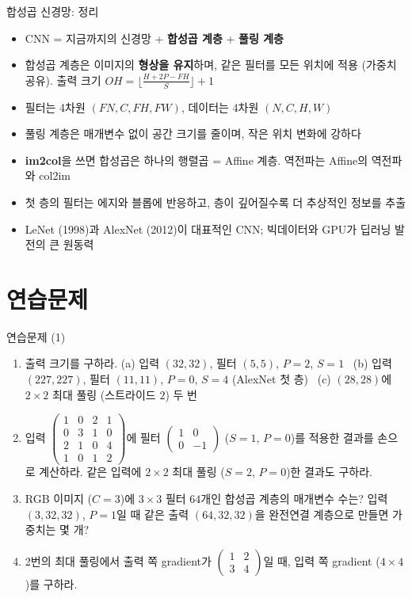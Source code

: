 \documentclass[aspectratio=169,11pt]{beamer}
\begin{document}
\begin{frame}{합성곱 신경망: 정리}
\begin{keybox}
\small
\begin{itemize}
\item CNN = 지금까지의 신경망 + \textbf{합성곱 계층} + \textbf{풀링 계층}
\item 합성곱 계층은 이미지의 \textbf{형상을 유지}하며, 같은 필터를 모든 위치에 적용 (가중치 공유).
출력 크기 $OH=\lfloor\frac{H+2P-FH}{S}\rfloor+1$
\item 필터는 4차원 $(FN,C,FH,FW)$, 데이터는 4차원 $(N,C,H,W)$
\item 풀링 계층은 매개변수 없이 공간 크기를 줄이며, 작은 위치 변화에 강하다
\item \textbf{im2col}을 쓰면 합성곱은 하나의 행렬곱 = Affine 계층. 역전파는 Affine의 역전파와 col2im
\item 첫 층의 필터는 에지와 블롭에 반응하고, 층이 깊어질수록 더 추상적인 정보를 추출
\item LeNet (1998)과 AlexNet (2012)이 대표적인 CNN; 빅데이터와 GPU가 딥러닝 발전의 큰 원동력
\end{itemize}
\end{keybox}
\end{frame}

\section{연습문제}

\begin{frame}{연습문제 (1)}
\small
\begin{enumerate}
\item 출력 크기를 구하라. (a) 입력 $(32,32)$, 필터 $(5,5)$, $P=2$, $S=1$ \
(b) 입력 $(227,227)$, 필터 $(11,11)$, $P=0$, $S=4$ (AlexNet 첫 층) \
(c) $(28,28)$에 $2\times2$ 최대 풀링 (스트라이드 $2$) 두 번
\item 입력 $\begin{pmatrix}1&0&2&1\\0&3&1&0\\2&1&0&4\\1&0&1&2\end{pmatrix}$에
필터 $\begin{pmatrix}1&0\\0&-1\end{pmatrix}$ ($S=1$, $P=0$)를 적용한 결과를 손으로 계산하라. 같은 입력에 $2\times2$ 최대 풀링 ($S=2$, $P=0$)한 결과도 구하라.
\item RGB 이미지 ($C=3$)에 $3\times3$ 필터 $64$개인 합성곱 계층의 매개변수 수는?
입력 $(3,32,32)$, $P=1$일 때 같은 출력 $(64,32,32)$을 완전연결 계층으로 만들면 가중치는 몇 개?
\item 2번의 최대 풀링에서 출력 쪽 gradient가 $\begin{pmatrix}1&2\\3&4\end{pmatrix}$일 때, 입력 쪽 gradient ($4\times4$)를 구하라.
\end{enumerate}
\end{frame}
\end{document}
